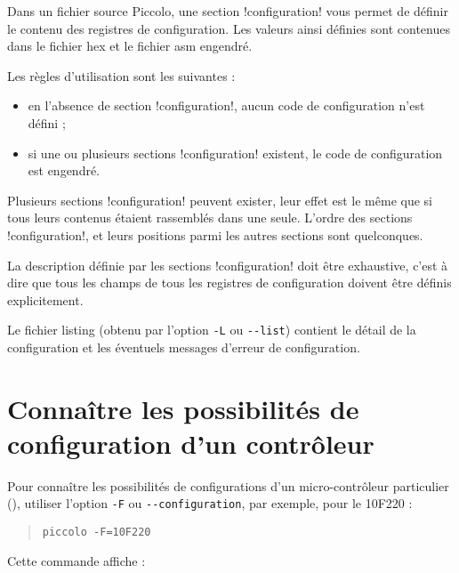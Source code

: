


\thispagestyle{empty}

Dans un fichier source Piccolo, une section \pic!configuration! vous permet de définir le contenu des registres de configuration. Les valeurs ainsi définies sont contenues dans le fichier hex et le fichier asm engendré.


Les règles d'utilisation sont les suivantes :
\begin{itemize}
  \item en l’absence de section \pic!configuration!, aucun code de configuration n’est défini ;
  \item si une ou plusieurs sections \pic!configuration! existent, le code de configuration est engendré.
\end{itemize}

Plusieurs sections \pic!configuration! peuvent exister, leur effet est le même que si tous leurs contenus étaient rassemblés dans une seule. L’ordre des sections \pic!configuration!, et leurs positions parmi les autres sections sont quelconques.

La description définie par les sections \pic!configuration! doit être exhaustive, c’est à dire que tous les champs de tous les registres de configuration doivent être définis explicitement.

Le fichier listing (obtenu par l’option \texttt{-L} ou \texttt{-{}-list}) contient le détail de la configuration et les éventuels messages d’erreur de configuration.




\section{Connaître les possibilités de configuration d'un contrôleur}

Pour connaître les possibilités de configurations d’un micro-contrôleur particulier (), utiliser l’option \texttt{-F} ou \texttt{-{}-configuration}, par exemple, pour le 10F220 :
\begin{quote}
\texttt{piccolo -F=10F220}
\end{quote}

Cette commande affiche :


